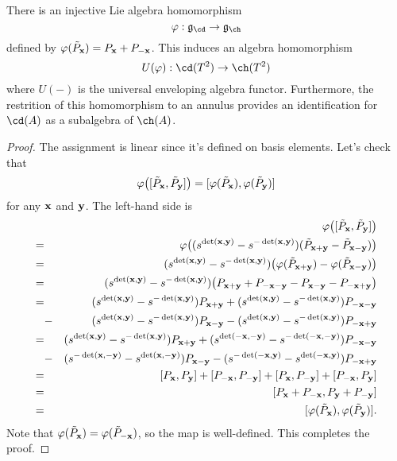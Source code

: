 \begin{proposition}
There is an injective Lie algebra homomorphism 
\[
\varphi: \mathfrak{g}_\cd \to \mathfrak{g}_\ch 
\]
defined by $\varphi(\tilde{P}_{\mathbf{x}}) = P_{\mathbf{x}} + P_{-{\mathbf{x}}}$. This induces an algebra homomorphism
\[
U(\varphi): \cd(T^2) \to \ch(T^2)
\]
where $U(-)$ is the universal enveloping algebra functor. Furthermore, the restrition of this homomorphism to an annulus provides an identification for $\cd(A)$ as a subalgebra of $\ch(A)$.
\end{proposition}
\begin{proof}
The assignment is linear since it's defined on basis elements. Let's check that
\[
\varphi\big( [\tilde{P}_{\mathbf{x}}, \tilde{P}_{\mathbf{y}}] \big) = [\varphi(\tilde{P}_{\mathbf{x}}), \varphi(\tilde{P}_{\mathbf{y}})]
\]
for any ${\mathbf{x}}$ and ${\mathbf{y}}$. The left-hand side is
\begin{eqnarray*}
&&\varphi\big( [\tilde{P}_{\mathbf{x}}, \tilde{P}_{\mathbf{y}}] \big) \\
=&& \varphi\big( (s^{\det({\mathbf{x}}, {\mathbf{y}})} - s^{-\det({\mathbf{x}}, {\mathbf{y}})})(\tilde{P}_{{\mathbf{x}}+{\mathbf{y}}} - \tilde{P}_{{\mathbf{x}}-{\mathbf{y}}}) \big) \\
=&& (s^{\det({\mathbf{x}}, {\mathbf{y}})} - s^{-\det({\mathbf{x}}, {\mathbf{y}})}) \big( \varphi(\tilde{P}_{{\mathbf{x}}+{\mathbf{y}}}) - \varphi(\tilde{P}_{{\mathbf{x}}-{\mathbf{y}}}) \big) \\
=&& (s^{\det({\mathbf{x}}, {\mathbf{y}})} - s^{-\det({\mathbf{x}}, {\mathbf{y}})}) \big( P_{{\mathbf{x}}+{\mathbf{y}}} + P_{-{\mathbf{x}}-{\mathbf{y}}} - P_{{\mathbf{x}}-{\mathbf{y}}} - P_{-{\mathbf{x}}+{\mathbf{y}}} \big) \\
=&& (s^{\det({\mathbf{x}}, {\mathbf{y}})} - s^{-\det({\mathbf{x}}, {\mathbf{y}})}) P_{{\mathbf{x}}+{\mathbf{y}}} + (s^{\det({\mathbf{x}}, {\mathbf{y}})} - s^{-\det({\mathbf{x}}, {\mathbf{y}})}) P_{-{\mathbf{x}}-{\mathbf{y}}} \\
&-& (s^{\det({\mathbf{x}}, {\mathbf{y}})} - s^{-\det({\mathbf{x}}, {\mathbf{y}})}) P_{{\mathbf{x}}-{\mathbf{y}}} - (s^{\det({\mathbf{x}}, {\mathbf{y}})} - s^{-\det({\mathbf{x}}, {\mathbf{y}})}) P_{-{\mathbf{x}}+{\mathbf{y}}} \\
=&& (s^{\det({\mathbf{x}}, {\mathbf{y}})} - s^{-\det({\mathbf{x}}, {\mathbf{y}})}) P_{{\mathbf{x}}+{\mathbf{y}}} + (s^{\det(-{\mathbf{x}}, -{\mathbf{y}})} - s^{-\det(-{\mathbf{x}}, -{\mathbf{y}})}) P_{-{\mathbf{x}}-{\mathbf{y}}} \\
&-& (s^{-\det({\mathbf{x}}, -{\mathbf{y}})} - s^{\det({\mathbf{x}}, -{\mathbf{y}})}) P_{{\mathbf{x}}-{\mathbf{y}}} - (s^{-\det(-{\mathbf{x}}, {\mathbf{y}})} - s^{\det(-{\mathbf{x}}, {\mathbf{y}})}) P_{-{\mathbf{x}}+{\mathbf{y}}} \\
=&& [P_{\mathbf{x}}, P_{\mathbf{y}}] + [P_{-{\mathbf{x}}}, P_{-{\mathbf{y}}}] + [P_{{\mathbf{x}}}, P_{-{\mathbf{y}}}] + [P_{-{\mathbf{x}}}, P_{{\mathbf{y}}}] \\
=&& [P_{{\mathbf{x}}} + P_{-{\mathbf{x}}}, P_{{\mathbf{y}}} + P_{-{\mathbf{y}}}] \\
=&& [\varphi(\tilde{P}_{\mathbf{x}}), \varphi(\tilde{P}_{\mathbf{y}})].
\end{eqnarray*}
Note that $\varphi(\tilde{P}_{\mathbf{x}}) = \varphi(\tilde{P}_{-{\mathbf{x}}})$, so the map is well-defined. This completes the proof.
\end{proof}

